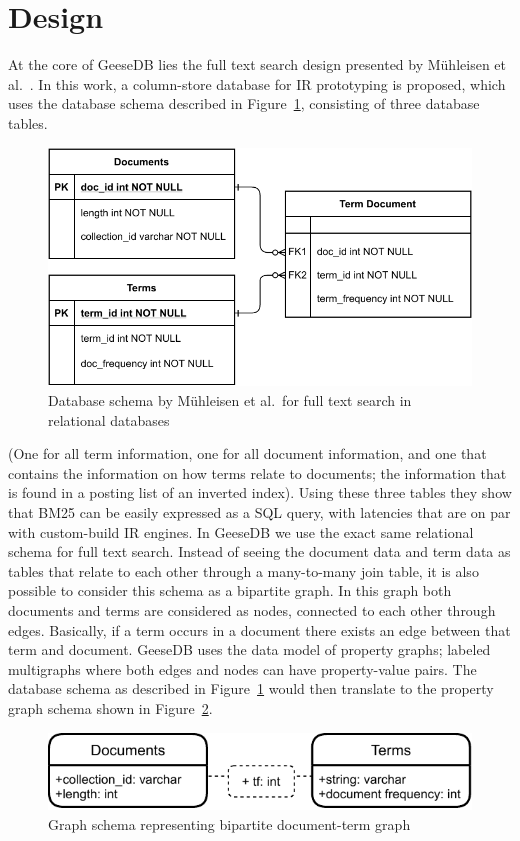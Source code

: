 \section{Design}
At the core of GeeseDB lies the full text search design presented by M\"{u}hleisen et al.~\cite{OldDog}. In this work, a column-store database for IR prototyping is proposed, which uses the database schema described in Figure~\ref{olddog_schema}, consisting of three database tables.
\begin{figure}
	\centering
	\includegraphics[width=\linewidth]{./imgs/olddog-schema-2.pdf}
	\caption{Database schema by M\"{u}hleisen et al.~for full text search in relational databases}
	\label{olddog_schema}
\end{figure}
(One for all term information, one for all document information, and one that contains the information on how terms relate to documents; the information that is found in a posting list of an inverted index). Using these three tables they show that BM25 can be easily expressed as a SQL query, with latencies that are on par with custom-build IR engines. In GeeseDB we use the exact same relational schema for full text search.
Instead of seeing the document data and term data as tables that relate to each other through a many-to-many join table, it is also possible to consider this schema as a bipartite graph. In this graph both documents and terms are considered as nodes, connected to each other through edges. Basically, if a term occurs in a document there exists an edge between that term and document. GeeseDB uses the data model of property graphs; labeled multigraphs where both edges and nodes can have property-value pairs. The database schema as described in Figure~\ref{olddog_schema} would then translate to the property graph schema shown in Figure~\ref{olddog-graph-schema}.
\begin{figure}
	\centering
	\includegraphics[width=\linewidth]{./imgs/olddog-graph-schema.pdf}
	\caption{Graph schema representing bipartite document-term graph}
	\label{olddog-graph-schema}
\end{figure}
